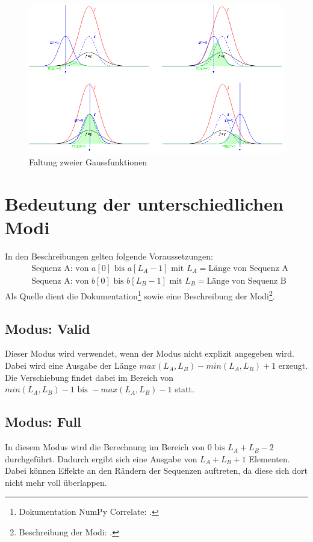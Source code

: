 \begin{figure}[H]
  \centering
  \includegraphics[width=0.8\linewidth]{./images/convolution2.png}
  \caption[Beispiel 2 für die Faltung]{Faltung zweier Gaussfunktionen\footnotemark}
  \label{fig:convolutionExample2}
\end{figure}

\section{Bedeutung der unterschiedlichen Modi}
\begin{samepage}
  In den Beschreibungen gelten folgende Voraussetzungen: 
  \begin{align*}
    & \text{Sequenz A: von }a[0] \text{ bis }a[L_A - 1] \text{ mit } L_A = \text{Länge von Sequenz A}\\
    & \text{Sequenz A: von }b[0] \text{ bis }b[L_B - 1] \text{ mit } L_B = \text{Länge von Sequenz B}
  \end{align*}
  Als Quelle dient die Dokumentation\footnote{ Dokumentation NumPy Correlate: \cite{DocumentationNumpyCorrelate}.} sowie eine Beschreibung der 
  Modi\footnote{ Beschreibung der Modi: \cite{NumPyCorrelationModesExplained}.}.
\end{samepage}


\subsection{Modus: Valid}\label{sec:numpy_correlate_mode}
Dieser Modus wird verwendet, wenn der Modus nicht explizit angegeben wird.\\
Dabei wird eine Ausgabe der Länge $ max(L_A, L_B) - min(L_A, L_B) + 1 $ erzeugt. Die Verschiebung findet dabei im Bereich 
von $ min(L_A, L_B) - 1 \text{ bis } - max(L_A, L_B) - 1 $ statt.

\subsection{Modus: Full}
In diesem Modus wird die Berechnung im Bereich von $ 0 \text{ bis }  L_A + L_B - 2 $ durchgeführt. 
Dadurch ergibt sich eine Ausgabe von $ L_A + L_B + 1 $ Elementen. Dabei können Effekte an den Rändern der Sequenzen auftreten, da diese
sich dort nicht mehr voll überlappen.

